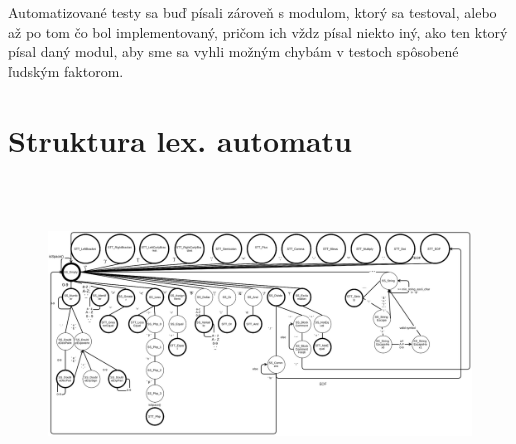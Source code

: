 \documentclass[12pt,a4paper,titlepage,final]{article}
\begin{document}
Automatizované testy sa buď písali zároveň s modulom, ktorý sa testoval, alebo až po tom čo
bol implementovaný, pričom ich vždz písal niekto iný, ako ten ktorý písal daný modul,
aby sme sa vyhli možným chybám v testoch spôsobené ľudským faktorom.

\newpage
\appendix

\section{Struktura lex. automatu}
\begin{figure}[!h]
\begin{sideways}
  \centering
  \includegraphics[height=310px]{doc/img/lex_analyza.eps}
\end{sideways}
\end{figure}
\newpage
\end{document}
